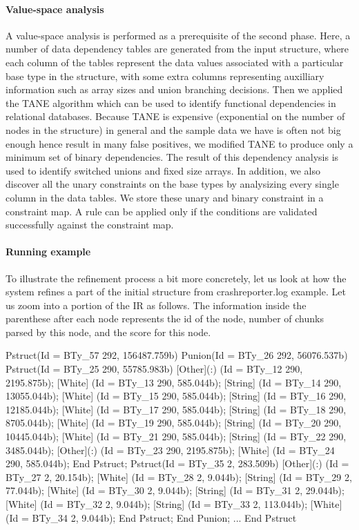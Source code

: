 \paragraph*{Value-space analysis}
A value-space analysis is performed as a prerequisite of the second phase.
Here, a number of data dependency tables are generated from the 
input structure, where each
column of the tables represent the data values associated with a particular base type 
in the structure, with some extra columns representing auxilliary information such as
array sizes and union branching decisions. Then we applied the TANE algorithm \cite{TANE-HKPT99}
which can be used to identify functional dependencies in relational databases.
Because TANE is expensive (exponential on the number of nodes in the structure) 
in general and the sample data we have is often not big enough hence 
result in many false positives, we modified TANE to produce only a minimum set 
of binary dependencies. The result of this dependency analysis is used to 
identify switched unions and fixed size arrays.
In addition, we also discover all the unary constraints on the base types by
analysizing every single column in the data tables. We store these unary and
binary constraint in a constraint map.  A rule can be applied 
only if the conditions are validated successfully
against the constraint map. 

\paragraph*{Running example}
To illustrate the refinement process a bit more concretely, let us look at how
the system refines a part of the initial structure from crashreporter.log example.
Let us zoom into a portion of the IR as follows. The information inside the
parenthese after each node represents the id of the node, number of
chunks parsed by this node, and the score for this node.

\begin{code}
Pstruct(Id = BTy_57 292, 156487.759b)
  Punion(Id = BTy_26 292, 56076.537b)
    Pstruct(Id = BTy_25 290, 55785.983b)
      [Other](:) (Id = BTy_12 290, 2195.875b);
      [White] (Id = BTy_13 290, 585.044b);
      [String] (Id = BTy_14 290, 13055.044b);
      [White] (Id = BTy_15 290, 585.044b);
      [String] (Id = BTy_16 290, 12185.044b);
      [White] (Id = BTy_17 290, 585.044b);
      [String] (Id = BTy_18 290, 8705.044b);
      [White] (Id = BTy_19 290, 585.044b);
      [String] (Id = BTy_20 290, 10445.044b);
      [White] (Id = BTy_21 290, 585.044b);
      [String] (Id = BTy_22 290, 3485.044b);
      [Other](:) (Id = BTy_23 290, 2195.875b);
      [White] (Id = BTy_24 290, 585.044b);
    End Pstruct;
    Pstruct(Id = BTy_35 2, 283.509b)
    [Other](:) (Id = BTy_27 2, 20.154b);
      [White] (Id = BTy_28 2, 9.044b);
      [String] (Id = BTy_29 2, 77.044b);
      [White] (Id = BTy_30 2, 9.044b);
      [String] (Id = BTy_31 2, 29.044b);
      [White] (Id = BTy_32 2, 9.044b);
      [String] (Id = BTy_33 2, 113.044b);
      [White] (Id = BTy_34 2, 9.044b);
    End Pstruct;
  End Punion;
  ...
End Pstruct
\end{code}

